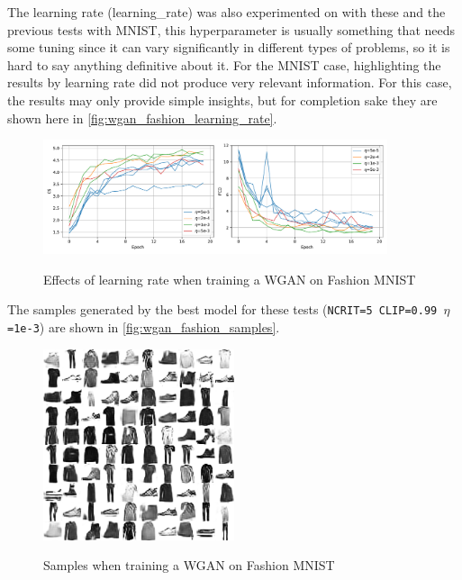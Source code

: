 The learning rate (\gls{learning_rate}) was also experimented on with these and the previous tests with \gls{MNIST}, this hyperparameter is usually something that needs some tuning since it can vary significantly in different types of problems, so it is hard to say anything definitive about it. For the \gls{MNIST} case, highlighting the results by learning rate did not produce very relevant information. For this case, the results may only provide simple insights, but for completion sake they are shown here in \autoref{fig:wgan_fashion_learning_rate}.
\begin{figure}[hbt]
    \centering
    \caption{Effects of learning rate when training a WGAN on Fashion MNIST}
    \includegraphics[width=0.9\textwidth]{chapters/Experiments/WGAN/fashion_learning_rate.pdf}
    \label{fig:wgan_fashion_learning_rate}
\end{figure}

The samples generated by the best model for these tests (\texttt{NCRIT=5 CLIP=0.99 $\eta$=1e-3}) are shown in \autoref{fig:wgan_fashion_samples}.
\begin{figure}[hbt]
    \centering
    \caption{Samples when training a WGAN on Fashion MNIST}
    \includegraphics[width=0.5\textwidth]{chapters/Experiments/WGAN/fashion_samples.png}
    \label{fig:wgan_fashion_samples}
\end{figure}
